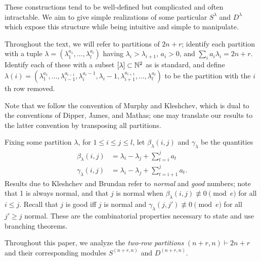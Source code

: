 \documentclass{amsart}
\begin{document}
  These constructions tend to be well-defined but complicated and often intractable.
  We aim to give simple realizations of some particular $S^\lambda$ and $D^\lambda$ which expose this structure while being intuitive and simple to manipulate.

  \vspace{5pt}
  Throughout the text, we will refer to partitions of $2n + r$;
  identify each partition with a tuple $\lambda = (\lambda_1^{a_1},\dots,\lambda_l^{a_l})$ having $\lambda_i > \lambda_{i+1}$, $a_i > 0$, and $\sum_i a_i\lambda_i = 2n + r$.
  Identify each of these with a subset $\left[ \lambda \right] \subset \mathbb{N}^2$ as is standard, and define $\lambda(i) = (\lambda_1^{a_1},\dots,\lambda_{i-1}^{a_{i-1}},\lambda_i^{a_i - 1},\lambda_i-1,\lambda_{i+1}^{a_{i+1}},\dots,\lambda_l^{a_l})$ to be the partition with the $i$th row removed.\cite{Kleshchev}

  Note that we follow the convention of Murphy and Kleshchev, which is dual to the conventions of Dipper, James, and Mathas;
  one may translate our results to the latter convention by transposing all partitions.\cite{Kleshchev,Mathas-book,Murphy1} 

  Fixing some partition $\lambda$, for $1 \leq i \leq j \leq l$, let $\beta_\lambda(i,j)$ and $\gamma_\lambda$ be the quantities
  \begin{align*}
    \beta_\lambda(i,j) &= \lambda_i - \lambda_j + \sum_{t = i}^j a_t\\
    \gamma_\lambda(i,j) &= \lambda_i - \lambda_j + \sum_{t = i+1}^j a_t.
  \end{align*}
  Results due to Kleshchev and Brundan refer to \emph{normal} and \emph{good} numbers;
  note that 1 is always normal, and that $j$ is normal when $\beta_\lambda(i,j) \not\equiv 0 \pmod e$ for all $i \leq j$.
  Recall that $j$ is good iff $j$ is normal and $\gamma_\lambda(j,j') \not\equiv 0 \pmod e$ for all $j' \geq j$ normal.\cite{Brundan,Kleshchev}
  These are the combinatorial properties necessary to state and use branching theorems.
  
  Throughout this paper, we analyze the \emph{two-row partitions} $(n+r,n) \vdash 2n + r$ and their corresponding modules $S^{(n+r,n)}$ and $D^{(n+r,n)}$.
\end{document}
